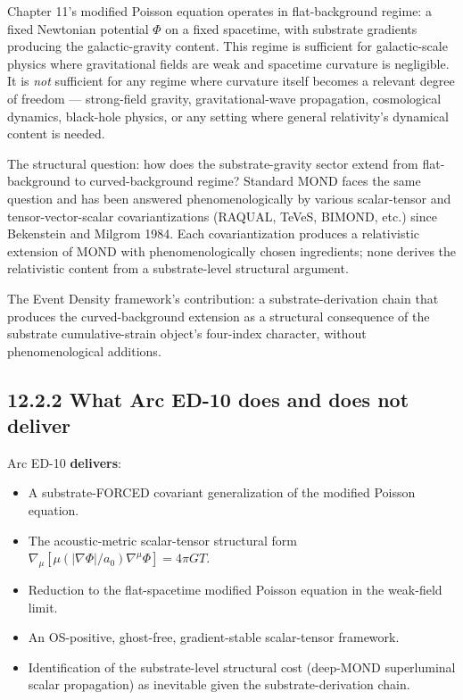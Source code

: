 \documentclass[11pt]{book}
\begin{document}
Chapter 11's modified Poisson equation operates in flat-background regime: a fixed Newtonian potential $\Phi$ on a fixed spacetime, with substrate gradients producing the galactic-gravity content. This regime is sufficient for galactic-scale physics where gravitational fields are weak and spacetime curvature is negligible. It is \textit{not} sufficient for any regime where curvature itself becomes a relevant degree of freedom — strong-field gravity, gravitational-wave propagation, cosmological dynamics, black-hole physics, or any setting where general relativity's dynamical content is needed.

The structural question: how does the substrate-gravity sector extend from flat-background to curved-background regime? Standard MOND faces the same question and has been answered phenomenologically by various scalar-tensor and tensor-vector-scalar covariantizations (RAQUAL, TeVeS, BIMOND, etc.) since Bekenstein and Milgrom 1984. Each covariantization produces a relativistic extension of MOND with phenomenologically chosen ingredients; none derives the relativistic content from a substrate-level structural argument.

The Event Density framework's contribution: a substrate-derivation chain that produces the curved-background extension as a structural consequence of the substrate cumulative-strain object's four-index character, without phenomenological additions.

\subsection{12.2.2 What Arc ED-10 does and does not deliver}

Arc ED-10 \textbf{delivers}:
\begin{itemize}
\item A substrate-FORCED covariant generalization of the modified Poisson equation.
\item The acoustic-metric scalar-tensor structural form $\nabla_\mu[\mu(|\nabla\Phi|/a_0)\nabla^\mu\Phi] = 4\pi G T$.
\item Reduction to the flat-spacetime modified Poisson equation in the weak-field limit.
\item An OS-positive, ghost-free, gradient-stable scalar-tensor framework.
\item Identification of the substrate-level structural cost (deep-MOND superluminal scalar propagation) as inevitable given the substrate-derivation chain.
\end{itemize}
\end{document}
